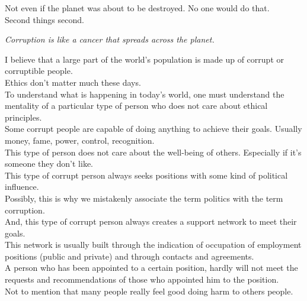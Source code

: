 \documentclass[11pt]{book}
\begin{document}
\noindent Not even if the planet was about to be destroyed. No one would do that. \\

\noindent Second things second. 

\noindent \begin{center} \emph{Corruption is like a cancer that spreads across the planet.} \end{center}

\noindent I believe that a large part of the world's population is made up of corrupt or corruptible people. \\

\noindent Ethics don't matter much these days. \\

\noindent To understand what is happening in today's world, one must understand the mentality of a particular type of person who does not care about ethical principles. \\

\noindent Some corrupt people are capable of doing anything to achieve their goals. Usually money, fame, power, control, recognition. \\

\noindent This type of person does not care about the well-being of others. Especially if it's someone they don't like. \\

\noindent This type of corrupt person always seeks positions with some kind of political influence.  \\

\noindent Possibly, this is why we mistakenly associate the term politics with the term corruption. \\

\noindent And, this type of corrupt person always creates a support network to meet their goals. \\

\noindent This network is usually built through the indication of occupation of employment positions (public and private) and through contacts and agreements. \\

\noindent A person who has been appointed to a certain position, hardly will not meet the requests and recommendations of those who appointed him to the position. \\

\noindent Not to mention that many people really feel good doing harm to others people. \\
\end{document}
